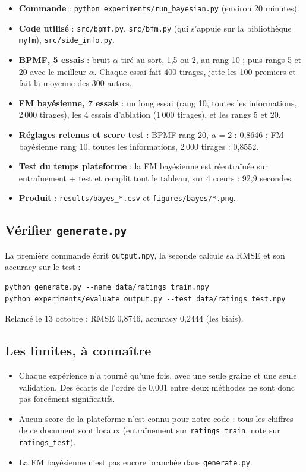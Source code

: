 \documentclass[11pt,a4paper]{article}
\begin{document}
\begin{itemize}
  \item \textbf{Commande} : \texttt{python experiments/run\_bayesian.py} (environ 20 minutes).
  \item \textbf{Code utilisé} : \texttt{src/bpmf.py}, \texttt{src/bfm.py} (qui s'appuie sur
        la bibliothèque \texttt{myfm}), \texttt{src/side\_info.py}.
  \item \textbf{BPMF, 5 essais} : bruit $\alpha$ tiré au sort, 1,5 ou 2, au rang 10 ; puis
        rangs 5 et 20 avec le meilleur $\alpha$. Chaque essai fait 400 tirages, jette les
        100 premiers et fait la moyenne des 300 autres.
  \item \textbf{FM bayésienne, 7 essais} : un long essai (rang 10, toutes les informations,
        2\,000 tirages), les 4 essais d'ablation (1\,000 tirages), et les rangs 5 et 20.
  \item \textbf{Réglages retenus et score test} : BPMF rang 20, $\alpha = 2$ : 0,8646 ;
        FM bayésienne rang 10, toutes les informations, 2\,000 tirages : 0,8552.
  \item \textbf{Test du temps \og plateforme \fg} : la FM bayésienne est réentraînée sur
        entraînement + test et remplit tout le tableau, sur 4 c\oe urs : 92,9 secondes.
  \item \textbf{Produit} : \texttt{results/bayes\_*.csv} et \texttt{figures/bayes/*.png}.
\end{itemize}

\subsection{Vérifier \texttt{generate.py}}

La première commande écrit \texttt{output.npy}, la seconde calcule sa RMSE et son
accuracy sur le test :
\begin{verbatim}
python generate.py --name data/ratings_train.npy
python experiments/evaluate_output.py --test data/ratings_test.npy
\end{verbatim}
Relancé le 13 octobre : RMSE 0,8746, accuracy 0,2444 (les biais).

\subsection{Les limites, à connaître}

\begin{itemize}
  \item Chaque expérience n'a tourné qu'une fois, avec une seule graine et une seule
        validation. Des écarts de l'ordre de 0,001 entre deux méthodes ne sont donc pas
        forcément significatifs.
  \item Aucun score de la plateforme n'est connu pour notre code : tous les chiffres de ce
        document sont locaux (entraînement sur \texttt{ratings\_train}, note sur
        \texttt{ratings\_test}).
  \item La FM bayésienne n'est pas encore branchée dans \texttt{generate.py}.
\end{itemize}
\end{document}
